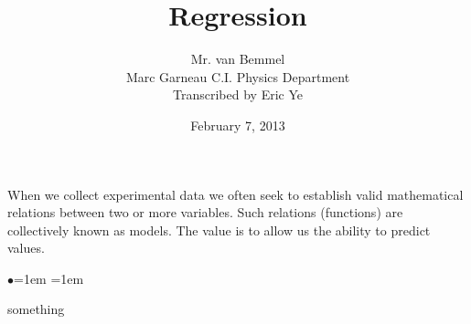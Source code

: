 \documentclass[letterpaper, 12pt]{article}
\begin{document}
\title{Regression}
\author{Mr. van Bemmel\\
Marc Garneau C.I. Physics Department\\
Transcribed by Eric Ye}
\renewcommand{\today}{February 7, 2013}
\date{\today}
\maketitle

When we collect experimental data we often seek to establish valid mathematical relations between two or more variables.
Such relations (functions) are collectively known as models.
The value is to allow us the ability to predict values.

\begin{list}{$\bullet$}{\leftmargin=1em \itemindent=1em}
\item something


\end{list}
\end{document}
